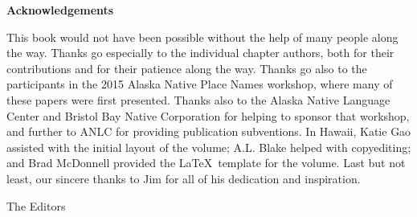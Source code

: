 \thispagestyle{plain}
{\parindent0pt
\parskip6pt


\textbf{\large Acknowledgements}
\vspace{6pt}

This book would not have been possible without the help of many people along the way. Thanks go especially to the individual chapter authors, both for their contributions and for their patience along the way. Thanks go also to the participants in the 2015 Alaska Native Place Names workshop, where many of these papers were first presented. Thanks also to the Alaska Native Language Center and  Bristol Bay Native Corporation for helping to sponsor that workshop, and further to ANLC for providing publication subventions.  In Hawaii, Katie Gao assisted with the initial layout of the volume; A.L. Blake helped with copyediting; and Brad McDonnell provided the \LaTeX\ template for the volume.  Last but not least, our sincere thanks to Jim for all of his dedication and inspiration.

The Editors

}
